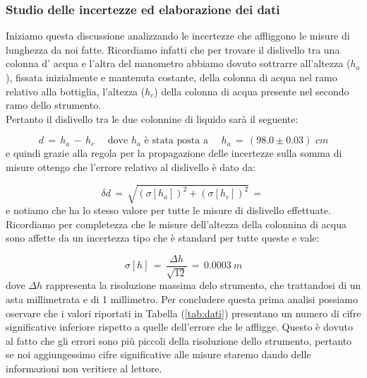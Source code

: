\subsubsection{Studio delle incertezze ed elaborazione dei dati}

\begin{table}
\end{table}

Iniziamo questa discussione analizzando le incertezze che affliggono le misure di lunghezza da noi fatte. Ricordiamo infatti che per trovare il dislivello tra una colonna d' acqua e l'altra del manometro abbiamo dovuto sottrarre all'altezza ($h_a$), fissata inizialmente e mantenuta costante, della colonna di acqua nel ramo relativo alla bottiglia, l'altezza ($h_c$) della colonna di acqua presente nel secondo ramo dello strumento.\\
Pertanto il dislivello tra le due colonnine di liquido sarà il seguente:

\begin{equation*}
	d \,=\, h_a \,-\, h_c \,\,\quad \text{dove $h_a$ è stata posta a} \quad\,\, h_a \,=\, (98.0 \pm 0.03)\,\,cm 
\end{equation*}
%
e quindi grazie alla regola per la propagazione delle incertezze sulla somma di misure ottengo che l'errore relativo al dislivello è dato da:

\begin{equation*}
	\delta d \,=\, \sqrt{(\sigma [h_a])^2+(\sigma [h_c])^2} \,=\,
\end{equation*}
%
e notiamo che ha lo stesso valore per tutte le misure di dislivello effettuate. Ricordiamo per completezza che le misure dell'altezza della colonnina di acqua sono affette da un incertezza tipo che è standard per tutte queste e vale:

\begin{equation*}
	\sigma [h] \,=\, \frac{\Delta h}{\sqrt{12}} \,=\, \SI{0.0003}{m} 
\end{equation*}
%
dove $\Delta h$ rappresenta la risoluzione massima delo strumento, che trattandosi di un asta millimetrata e di 1 millimetro. Per concludere questa prima analisi possiamo oservare che i valori riportati in Tabella (\ref{tab:dati}) presentano un numero di cifre significative inferiore rispetto a quelle dell'errore che le affligge. Questo è dovuto al fatto che gli errori sono più piccoli della risoluzione dello strumento, pertanto se noi aggiungessimo cifre significative alle misure staremo dando delle informazioni non veritiere al lettore.\\

